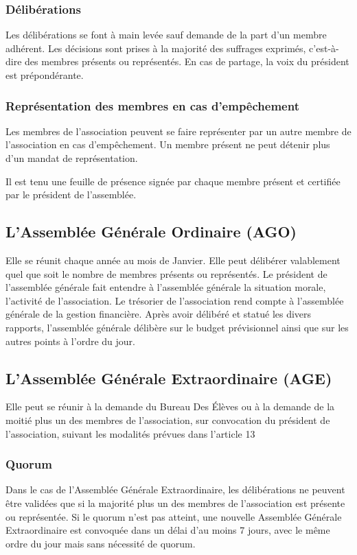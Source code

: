 \documentclass{article} %
\begin{document}
			\subsubsection{Délibérations}
				Les délibérations se font à main levée sauf demande de la part d’un membre adhérent. Les décisions sont prises à la
				majorité des suffrages exprimés, c’est-à-dire des membres présents ou représentés. En cas de partage, la voix du président est prépondérante. 

			\subsubsection{Représentation des membres en cas d’empêchement}
				Les membres de l’association peuvent se faire représenter par un autre membre de l’association en cas d’empêchement.
				Un membre présent ne peut détenir plus d’un mandat de représentation.

				Il est tenu une feuille de présence signée par chaque membre présent et certifiée par le président de l’assemblée.

		\subsection{L’Assemblée Générale Ordinaire (AGO)}
			Elle se réunit chaque année au mois de Janvier. Elle peut délibérer valablement quel que soit le nombre de membres présents ou représentés.
			Le président de l’assemblée générale fait entendre à l’assemblée générale la situation morale, l’activité de l’association.
			Le trésorier de l’association rend compte à l’assemblée générale de la gestion financière. Après avoir délibéré et statué les divers rapports,
			l’assemblée générale délibère sur le budget prévisionnel ainsi que sur les autres points à l’ordre du jour. 

		\subsection{L’Assemblée Générale Extraordinaire (AGE)}
			Elle peut se réunir à la demande du Bureau Des Élèves ou à la demande de la moitié plus un des membres de l’association,
			sur convocation du président de l’association, suivant les modalités prévues dans l’article 13

			\subsubsection{Quorum}
				Dans le cas de l’Assemblée Générale Extraordinaire, les délibérations ne peuvent être validées que si la majorité plus un
				des membres de l’association est présente ou représentée. Si le quorum n’est pas atteint, une nouvelle Assemblée Générale Extraordinaire
				est convoquée dans un délai d’au moins 7 jours, avec le même ordre du jour mais sans nécessité de quorum.
\end{document}
